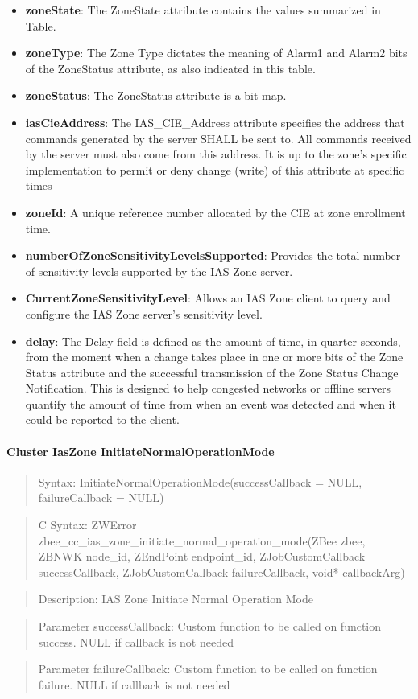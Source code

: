 \begin{itemize}
\item \textbf{zoneState}: The ZoneState attribute contains the values summarized in Table.
\item \textbf{zoneType}: The Zone Type dictates the meaning of Alarm1 and Alarm2 bits of the ZoneStatus attribute, as also indicated in this table.
\item \textbf{zoneStatus}: The ZoneStatus attribute is a bit map.
\item \textbf{iasCieAddress}: The IAS\_CIE\_Address attribute specifies the address that commands generated by the server SHALL be sent to. All commands received by the server must also come from this address. It is up to the zone's specific implementation to permit or deny change (write) of this attribute at specific times
\item \textbf{zoneId}: A unique reference number allocated by the CIE at zone enrollment time.
\item \textbf{numberOfZoneSensitivityLevelsSupported}: Provides the total number of sensitivity levels supported by the IAS Zone server.
\item \textbf{CurrentZoneSensitivityLevel}: Allows an IAS Zone client to query and configure the IAS Zone server’s sensitivity level.
\item \textbf{delay}: The Delay field is defined as the amount of time, in quarter-seconds, from the moment when a change takes place in one or more bits of the Zone Status attribute and the successful transmission of the Zone Status Change Notification. This is designed to help congested networks or offline servers quantify the amount of time from when an event was detected and when it could be reported to the client.
\end{itemize}

\paragraph{Cluster IasZone InitiateNormalOperationMode}
\begin{quote}Syntax: InitiateNormalOperationMode(successCallback = NULL, failureCallback = NULL)\end{quote}
\begin{quote}C Syntax: ZWError zbee\_cc\_ias\_zone\_initiate\_normal\_operation\_mode(ZBee zbee, ZBNWK node\_id, ZEndPoint endpoint\_id, ZJobCustomCallback successCallback, ZJobCustomCallback failureCallback, void* callbackArg)\end{quote}
\begin{quote}Description: IAS Zone Initiate Normal Operation Mode\end{quote}
\begin{quote}Parameter successCallback: Custom function to be called on function success. NULL if callback is not needed\end{quote}
\begin{quote}Parameter failureCallback: Custom function to be called on function failure. NULL if callback is not needed\end{quote}


